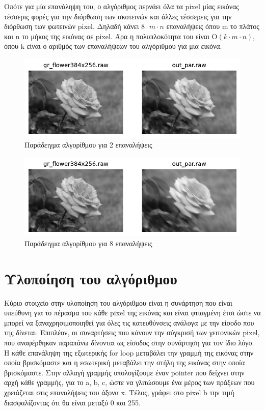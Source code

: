 \documentclass[12pt]{article}
\begin{document}
Οπότε για μία επανάληψη του, ο αλγόριθμος περνάει όλα τα pixel μίας εικόνας τέσσερις φορές για την διόρθωση των σκοτεινών και άλλες τέσσερεις για την διόρθωση των φωτεινών pixel. Δηλαδή κάνει $8\cdot m \cdot n$ επαναλήψεις όπου m το πλάτος και n το μήκος της εικόνας σε pixel. Άρα η πολυπλοκότητα του είναι  $\mathrm{O}(k \cdot m \cdot n)$, όπου k είναι ο αριθμός των επαναλήψεων του αλγόριθμου για μια εικόνα.

\begin{figure}[H]
    \centering
    \includegraphics[width=0.8\linewidth]{./pics/gr_flower384x256.pdf}
    \caption{Παράδειγμα αλγορίθμου για 2 επαναλήψεις}
\end{figure}

\begin{figure}[H]
    \centering
    \includegraphics[width=0.8\linewidth]{./pics/gr_flower384x256_blur.pdf}
    \caption{Παράδειγμα αλγορίθμου για 8 επαναλήψεις}
\end{figure}

\vspace{2em}

\section{Υλοποίηση του αλγόριθμου}

\vspace{1em}

Κύριο στοιχείο στην υλοποίηση του αλγόριθμου είναι η συνάρτηση που είναι υπεύθυνη για το πέρασμα του κάθε pixel της εικόνας και είναι φτιαγμένη έτσι ώστε να μπορεί να ξαναχρησιμοποιηθεί για όλες τις κατευθύνσεις ανάλογα με την είσοδο που της δίνεται. Επιπλέον, οι συναρτήσεις που κάνουν την σύγκρισή των γειτονικών pixel, που αναφέρθηκαν παραπάνω δίνονται ως είσοδος στην συνάρτηση για τον ίδιο λόγο. Η κάθε επανάληψη της εξωτερικής for loop μεταβάλει την γραμμή της εικόνας στην οποία βρισκόμαστε και η εσωτερική μεταβάλει την στήλη της εικόνας στην οποία βρισκόμαστε. Στην αλλαγή γραμμής υπολογίζουμε έναν pointer που δείχνει στην αρχή κάθε γραμμής, για το a, b, c, ώστε να γλιτώσουμε ένα μέρος των πράξεων που χρειάζεται στις επαναλήψεις του άξονα x. Τέλος, γράφει στο pixel b την τιμή διασφαλίζοντας ότι θα είναι μεταξύ 0 και 255.
\end{document}
